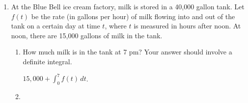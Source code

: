 \documentclass[main]{subfiles}
\begin{document}
\begin{enumerate}[resume]
\begin{enumerate}
  \item
    \begin{problem}[\vfill\newpage]
      $\displaystyle \int_2^4 [f(t) + t]\,dt + \int_4^5 f(t)\,dt$
    \end{problem}

    \begin{solution}
      Yes; we can rewrite this as
      \begin{align*}
        \int_2^4 [f(t) + t]\,dt + \int_4^5 f(t)\,dt &= \int_2^4 f(t)\,dt +
        \int_2^4 t\,dt + \int_4^5 f(t)\,dt \text{ by 
        the Additive Integrand Property} \\
        &= \int_2^5 f(t)\,dt + \int_2^4 t\,dt \text{ by the Splitting Interval
        Property} \\
        &= 7 + \int_2^4 t\,dt \\
        &= 7 + 6 \text{ by visualizing $\displaystyle \int_2^4 t\,dt$ as a
          signed area} \\
        &= \boxed{13}
      \end{align*}
    \end{solution}

  \end{enumerate}

\item 

  At the Blue Bell ice cream factory, milk is stored in a 40,000 gallon
  tank.  Let $f(t)$ be the rate (in gallons per hour) of milk flowing into
  and out of the tank on a certain day at time $t$, 
  where $t$ is measured in hours
  after noon.  At noon, there are 15,000 gallons of milk in the tank.
  \begin{enumerate}
  \item
    \begin{problem}[\vfill]
      How much milk is in the tank at 7 pm?  Your answer should involve a
      definite integral.
    \end{problem}

    \begin{solution}
      $\displaystyle 15,000 + \int_0^7 f(t)\,dt$. 
    \end{solution}

  \item


\end{enumerate}
\end{enumerate}
\end{document}
